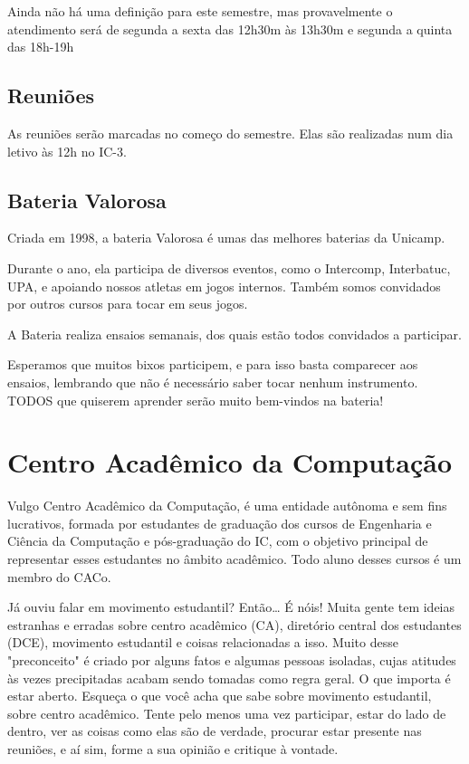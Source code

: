 Ainda não há uma definição para este semestre, mas provavelmente o atendimento
será de segunda a sexta das 12h30m às 13h30m e segunda a quinta das 18h-19h

\subsection{Reuniões}

As reuniões serão marcadas no começo do semestre. Elas são realizadas num dia
letivo às 12h no IC-3.

\subsection{Bateria Valorosa}

Criada em 1998, a bateria Valorosa é umas das melhores baterias da Unicamp.

Durante o ano, ela participa de diversos eventos, como o Intercomp, Interbatuc,
UPA, e apoiando nossos atletas em jogos internos. Também somos convidados por
outros cursos para tocar em seus jogos.

A Bateria realiza ensaios semanais, dos quais estão todos convidados a
participar.

Esperamos que muitos bixos participem, e para isso basta comparecer aos ensaios,
lembrando que não é necessário saber tocar nenhum instrumento. TODOS que
quiserem aprender serão muito bem-vindos na bateria!

\section{Centro Acadêmico da Computação}

Vulgo Centro Acadêmico da Computação, é uma entidade autônoma e sem fins
lucrativos, formada por estudantes de graduação dos cursos de Engenharia
e Ciência da Computação e pós-graduação do IC, com o objetivo principal de
representar esses estudantes no âmbito acadêmico. Todo aluno desses cursos é um
membro do CACo.

Já ouviu falar em movimento estudantil? Então{\dots} É nóis! Muita gente tem
ideias estranhas e erradas sobre centro acadêmico (CA), diretório central dos
estudantes (DCE), movimento estudantil e coisas relacionadas a isso. Muito desse
"preconceito" é criado por alguns fatos e algumas pessoas isoladas, cujas
atitudes às vezes precipitadas acabam sendo tomadas como regra geral. O que
importa é estar aberto. Esqueça o que você acha que sabe sobre movimento
estudantil, sobre centro acadêmico. Tente pelo menos uma vez participar, estar
do lado de dentro, ver as coisas como elas são de verdade, procurar estar
presente nas reuniões, e aí sim, forme a sua opinião e critique à vontade.

